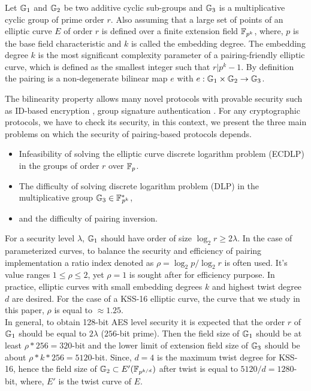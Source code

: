 Let ${\mathbb{G}}_{1}$ and ${\mathbb{G}}_{2}$ be two additive cyclic sub-groups and ${\mathbb{G}}_{3}$ is a multiplicative cyclic group of prime order $r$.
Also assuming that a large set of points of an elliptic curve $E$ of order $r$ is defined over a finite extension field $\mathbb{F}_{p^k}$, where, $p$ is the base field characteristic and $k$ is called the embedding degree.
 The embedding degree $k$ is the most significant complexity parameter of a pairing-friendly elliptic curve, which is defined as the smallest integer such that $r|p^k-1$. 
By definition the pairing is a non-degenerate bilinear map  $e$ with $e: {\mathbb{G}}_{1} \times {\mathbb{G}}_{2} \to {\mathbb{G}}_{3} $.

The bilinearity property allows many novel protocols with provable security such as  ID-based encryption \cite{AC:BonLynSha01},  group signature authentication \cite{C:BonBoySha04}.
For any cryptographic protocols, we have to check its security, in this context, we present the three main problems on which the security of pairing-based protocols depends.
\begin{itemize}
	\item  Infeasibility of solving the elliptic curve discrete logarithm problem (ECDLP) in the groups of order $r$ over ${\mathbb{F}}_{p}$.
	\item The  difficulty of solving discrete logarithm problem (DLP) in the multiplicative group ${\mathbb{G}}_{3} \in {{\mathbb{F}}^{\ast}}_{\!\!\!p^{k}}$,
	\item and the difficulty of pairing inversion.
\end{itemize}
For a security level $\lambda$, ${\mathbb{G}}_{1}$ should have order of size $\log_2 r \geq 2\lambda$.  
In the case of parameterized curves, to balance the security and efficiency of pairing implementation a ratio index denoted as $\rho = \log_2 p/ \log_2 r$ is often used.
It's value ranges $1\leq  \rho  \leq 2$, yet $\rho=1$ is sought after for efficiency purpose. 
In practice, elliptic curves with small embedding degrees $k$ and highest twist degree $d$ are desired.
For the case of a KSS-16 elliptic curve, the curve that we study in this paper, $\rho$ is equal to  $ \approx 1.25$. \\
In general, to obtain 128-bit AES level security it is expected that the order $r$ of ${\mathbb{G}}_{1}$ should be equal to $2\lambda $ ($256$-bit prime).
Then the field size  of  ${\mathbb{G}}_{1}$ should be at least $\rho*256 = 320$-bit and the lower limit of extension field size of ${\mathbb{G}}_{3}$ should be about $\rho*k*256= 5120$-bit.
Since,  $d=4$ is the maximum twist degree for KSS-16, hence the field size of ${\mathbb{G}}_{2} \subset E'(\mathbb{F}_{p^{k/d}})$ after twist is  equal to $5120/d=1280$-bit, where, $E'$ is the twist curve of $E$.

